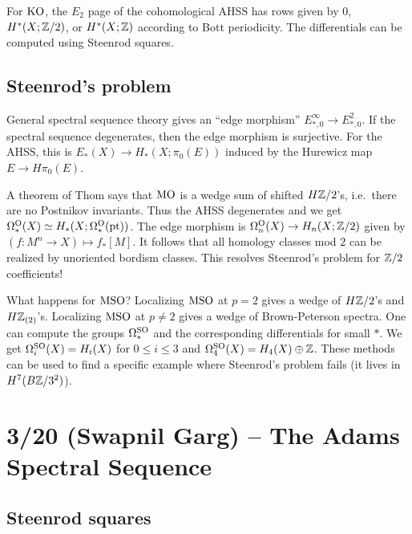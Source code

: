 \documentclass{article}
\begin{document}
\begin{ex}
	For $\mathrm{KO}$, the $E_2$ page of the cohomological AHSS has rows given by $0$, $H^*(X; \mathbb{Z}/2)$, or $H^*(X; \mathbb{Z})$ according to Bott periodicity.
	The differentials can be computed using Steenrod squares.
\end{ex}

\subsection{Steenrod's problem}

General spectral sequence theory gives an ``edge morphism'' $E^\infty_{*,0} \rightarrow E^2_{*,0}$.
If the spectral sequence degenerates, then the edge morphism is surjective.
For the AHSS, this is $E_*(X) \to H_*(X; \pi_0(E))$ induced by the Hurewicz map $E \to H\pi_0(E)$.

\begin{ex}
	A theorem of Thom says that $\mathrm{MO}$ is a wedge sum of shifted $H\mathbb{Z}/2$'s, i.e.\ there are no Postnikov invariants.
	Thus the AHSS degenerates and we get $\Omega^{\mathrm{O}}_*(X) \simeq H_*(X; \Omega^{\mathrm{O}}_*(\mathrm{pt}))$.
	The edge morphism is $\Omega^{\mathrm{O}}_n(X) \to H_n(X; \mathbb{Z}/2)$ given by $(f: M^n \to X) \mapsto f_*[M]$.
	It follows that all homology classes mod $2$ can be realized by unoriented bordism classes.
	This resolves Steenrod's problem for $\mathbb{Z}/2$ coefficients!
\end{ex}

\begin{ex}
	What happens for $\mathrm{MSO}$?
	Localizing $\mathrm{MSO}$ at $p = 2$ gives a wedge of $H\mathbb{Z}/2$'s and $H\mathbb{Z}_{(2)}$'s.
	Localizing $\mathrm{MSO}$ at $p \neq 2$ gives a wedge of Brown-Peterson spectra.
	One can compute the groups $\Omega_*^{\mathrm{SO}}$ and the corresponding differentials for small $*$.
	We get $\Omega_i^{\mathrm{SO}}(X) = H_i(X)$ for $0 \leq i \leq 3$ and $\Omega_4^{\mathrm{SO}}(X) = H_4(X) \oplus \mathbb{Z}$.
	These methods can be used to find a specific example where Steenrod's problem fails (it lives in $H^7(B\mathbb{Z}/3^2)$).
\end{ex}

\section{3/20 (Swapnil Garg) -- The Adams Spectral Sequence}

\subsection{Steenrod squares}
\end{document}
